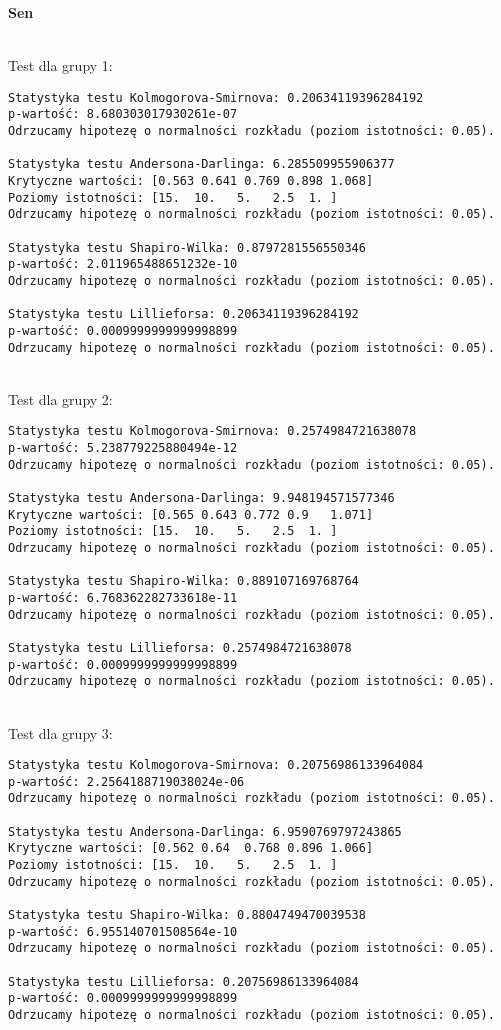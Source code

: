 \documentclass[12pt,a4paper]{article}
\begin{document}
\newpage
\begin{center}
    \textbf{Sen}
\end{center}
\\
Test dla grupy 1:
\begin{lstlisting}
Statystyka testu Kolmogorova-Smirnova: 0.20634119396284192
p-wartość: 8.680303017930261e-07
Odrzucamy hipotezę o normalności rozkładu (poziom istotności: 0.05).

Statystyka testu Andersona-Darlinga: 6.285509955906377
Krytyczne wartości: [0.563 0.641 0.769 0.898 1.068]
Poziomy istotności: [15.  10.   5.   2.5  1. ]
Odrzucamy hipotezę o normalności rozkładu (poziom istotności: 0.05).

Statystyka testu Shapiro-Wilka: 0.8797281556550346
p-wartość: 2.011965488651232e-10
Odrzucamy hipotezę o normalności rozkładu (poziom istotności: 0.05).

Statystyka testu Lillieforsa: 0.20634119396284192
p-wartość: 0.0009999999999998899
Odrzucamy hipotezę o normalności rozkładu (poziom istotności: 0.05).
\end{lstlisting}
\\
Test dla grupy 2:
\begin{lstlisting}
Statystyka testu Kolmogorova-Smirnova: 0.2574984721638078
p-wartość: 5.238779225880494e-12
Odrzucamy hipotezę o normalności rozkładu (poziom istotności: 0.05).

Statystyka testu Andersona-Darlinga: 9.948194571577346
Krytyczne wartości: [0.565 0.643 0.772 0.9   1.071]
Poziomy istotności: [15.  10.   5.   2.5  1. ]
Odrzucamy hipotezę o normalności rozkładu (poziom istotności: 0.05).

Statystyka testu Shapiro-Wilka: 0.889107169768764
p-wartość: 6.768362282733618e-11
Odrzucamy hipotezę o normalności rozkładu (poziom istotności: 0.05).

Statystyka testu Lillieforsa: 0.2574984721638078
p-wartość: 0.0009999999999998899
Odrzucamy hipotezę o normalności rozkładu (poziom istotności: 0.05).
\end{lstlisting}
\\
Test dla grupy 3:
\begin{lstlisting}
Statystyka testu Kolmogorova-Smirnova: 0.20756986133964084
p-wartość: 2.2564188719038024e-06
Odrzucamy hipotezę o normalności rozkładu (poziom istotności: 0.05).

Statystyka testu Andersona-Darlinga: 6.9590769797243865
Krytyczne wartości: [0.562 0.64  0.768 0.896 1.066]
Poziomy istotności: [15.  10.   5.   2.5  1. ]
Odrzucamy hipotezę o normalności rozkładu (poziom istotności: 0.05).

Statystyka testu Shapiro-Wilka: 0.8804749470039538
p-wartość: 6.955140701508564e-10
Odrzucamy hipotezę o normalności rozkładu (poziom istotności: 0.05).

Statystyka testu Lillieforsa: 0.20756986133964084
p-wartość: 0.0009999999999998899
Odrzucamy hipotezę o normalności rozkładu (poziom istotności: 0.05).
\end{lstlisting}
\end{document}
